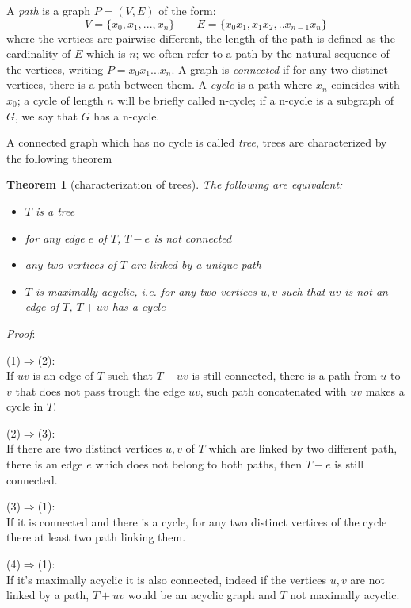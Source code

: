\documentclass[a4paper,12pt,twoside]{book}
\newtheorem{theorem}{Theorem}[chapter]
\begin{document}
A \textit{path} is a graph $P=(V,E)$ of the form:
$$ V=\{x_0,x_1, ..., x_n\} \qquad E=\{x_0 x_1, x_1x_2,.. x_{n-1}x_n\}$$ 
where the vertices are pairwise different, the length of the path is defined as the cardinality of $E$ which is $n$; we often refer to a path by the natural sequence of the vertices, writing $P=x_0x_1...x_n$. A graph is \textit{connected} if for any two distinct vertices, there is a path between them.  
A \textit{cycle} is a path where $x_n$ coincides with $x_0$; a cycle of length $n$ will be briefly called n-cycle; if a n-cycle is a subgraph of $G$, we say that $G$ has a n-cycle. 

\noindent A connected graph which has no cycle is called \textit{tree}, trees are characterized by the following theorem
\newpage
\begin{theorem}[characterization of trees] The following are equivalent:
\begin{itemize}
\item[(1)] $T$ is a tree
\item[(2)] for any edge $e$ of $T$, $T-e$ is not connected   
\item[(3)] any two vertices of $T$ are linked by a unique path
\item[(4)] $T$ is maximally acyclic, i.e. for any two vertices $u,v$ such that $uv$ is not an edge of $T$, $T+uv$ has a cycle
\end{itemize}
\end{theorem}
\noindent\textit{Proof}: 

(1)$\Rightarrow$(2):\\
If $uv$ is an edge of $T$ such that $T-uv$ is still connected, there is a path from $u$ to $v$ that does not pass trough the edge $uv$, such path concatenated with $uv$ makes a cycle in $T$.

(2)$\Rightarrow$(3):\\
If there are two distinct vertices $u,v$ of $T$ which are linked by two different  path, there is an edge $e$ which does not belong to both paths, then $T-e$ is still connected.

(3)$\Rightarrow$(1):\\
If it is connected and there is a cycle, for any two distinct vertices of the cycle there at least two path linking them.

(4)$\Rightarrow$(1):\\
If it's maximally acyclic it is also connected, indeed if the vertices $u,v$ are not linked by a path, $T+uv$ would be an acyclic graph and $T$ not maximally acyclic. 
\end{document}
